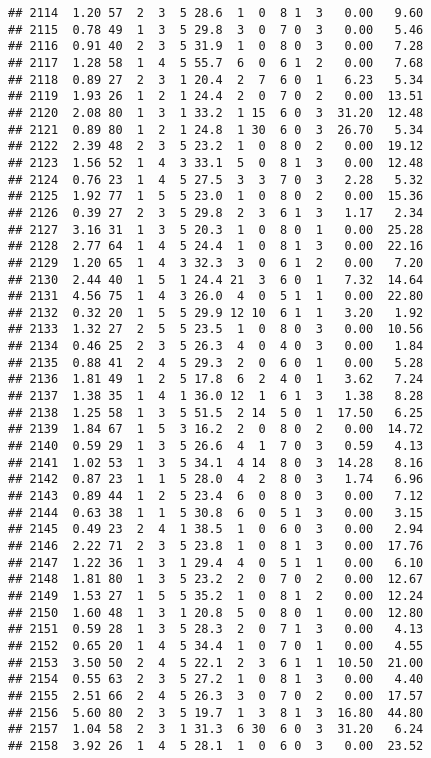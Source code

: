 \documentclass[
]{article}
\begin{document}
\begin{verbatim}
## 2114  1.20 57  2  3  5 28.6  1  0  8 1  3   0.00   9.60
## 2115  0.78 49  1  3  5 29.8  3  0  7 0  3   0.00   5.46
## 2116  0.91 40  2  3  5 31.9  1  0  8 0  3   0.00   7.28
## 2117  1.28 58  1  4  5 55.7  6  0  6 1  2   0.00   7.68
## 2118  0.89 27  2  3  1 20.4  2  7  6 0  1   6.23   5.34
## 2119  1.93 26  1  2  1 24.4  2  0  7 0  2   0.00  13.51
## 2120  2.08 80  1  3  1 33.2  1 15  6 0  3  31.20  12.48
## 2121  0.89 80  1  2  1 24.8  1 30  6 0  3  26.70   5.34
## 2122  2.39 48  2  3  5 23.2  1  0  8 0  2   0.00  19.12
## 2123  1.56 52  1  4  3 33.1  5  0  8 1  3   0.00  12.48
## 2124  0.76 23  1  4  5 27.5  3  3  7 0  3   2.28   5.32
## 2125  1.92 77  1  5  5 23.0  1  0  8 0  2   0.00  15.36
## 2126  0.39 27  2  3  5 29.8  2  3  6 1  3   1.17   2.34
## 2127  3.16 31  1  3  5 20.3  1  0  8 0  1   0.00  25.28
## 2128  2.77 64  1  4  5 24.4  1  0  8 1  3   0.00  22.16
## 2129  1.20 65  1  4  3 32.3  3  0  6 1  2   0.00   7.20
## 2130  2.44 40  1  5  1 24.4 21  3  6 0  1   7.32  14.64
## 2131  4.56 75  1  4  3 26.0  4  0  5 1  1   0.00  22.80
## 2132  0.32 20  1  5  5 29.9 12 10  6 1  1   3.20   1.92
## 2133  1.32 27  2  5  5 23.5  1  0  8 0  3   0.00  10.56
## 2134  0.46 25  2  3  5 26.3  4  0  4 0  3   0.00   1.84
## 2135  0.88 41  2  4  5 29.3  2  0  6 0  1   0.00   5.28
## 2136  1.81 49  1  2  5 17.8  6  2  4 0  1   3.62   7.24
## 2137  1.38 35  1  4  1 36.0 12  1  6 1  3   1.38   8.28
## 2138  1.25 58  1  3  5 51.5  2 14  5 0  1  17.50   6.25
## 2139  1.84 67  1  5  3 16.2  2  0  8 0  2   0.00  14.72
## 2140  0.59 29  1  3  5 26.6  4  1  7 0  3   0.59   4.13
## 2141  1.02 53  1  3  5 34.1  4 14  8 0  3  14.28   8.16
## 2142  0.87 23  1  1  5 28.0  4  2  8 0  3   1.74   6.96
## 2143  0.89 44  1  2  5 23.4  6  0  8 0  3   0.00   7.12
## 2144  0.63 38  1  1  5 30.8  6  0  5 1  3   0.00   3.15
## 2145  0.49 23  2  4  1 38.5  1  0  6 0  3   0.00   2.94
## 2146  2.22 71  2  3  5 23.8  1  0  8 1  3   0.00  17.76
## 2147  1.22 36  1  3  1 29.4  4  0  5 1  1   0.00   6.10
## 2148  1.81 80  1  3  5 23.2  2  0  7 0  2   0.00  12.67
## 2149  1.53 27  1  5  5 35.2  1  0  8 1  2   0.00  12.24
## 2150  1.60 48  1  3  1 20.8  5  0  8 0  1   0.00  12.80
## 2151  0.59 28  1  3  5 28.3  2  0  7 1  3   0.00   4.13
## 2152  0.65 20  1  4  5 34.4  1  0  7 0  1   0.00   4.55
## 2153  3.50 50  2  4  5 22.1  2  3  6 1  1  10.50  21.00
## 2154  0.55 63  2  3  5 27.2  1  0  8 1  3   0.00   4.40
## 2155  2.51 66  2  4  5 26.3  3  0  7 0  2   0.00  17.57
## 2156  5.60 80  2  3  5 19.7  1  3  8 1  3  16.80  44.80
## 2157  1.04 58  2  3  1 31.3  6 30  6 0  3  31.20   6.24
## 2158  3.92 26  1  4  5 28.1  1  0  6 0  3   0.00  23.52

\end{verbatim}
\end{document}

